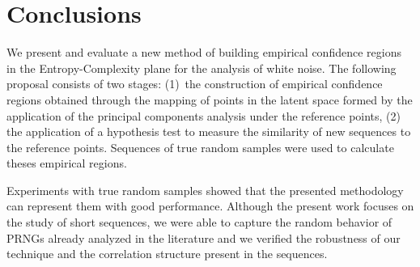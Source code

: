 \section{Conclusions}\label{Sec:Conclusions}

We present and evaluate a new method of building empirical confidence regions in the Entropy-Complexity plane for the analysis of white noise.
The following proposal consists of two stages:
(1)~the construction of empirical confidence regions obtained through the mapping of points in the latent space formed by the application of the principal components analysis under the reference points,
(2) ~ the application of a hypothesis test to measure the similarity of new sequences to the reference points.
Sequences of true random samples were used to calculate theses empirical regions.

Experiments with true random samples showed that the presented methodology can represent them with good performance.
Although the present work focuses on the study of short sequences, we were able to capture the random behavior of PRNGs already analyzed in the literature and we verified the robustness of our technique and the correlation structure present in the sequences.
